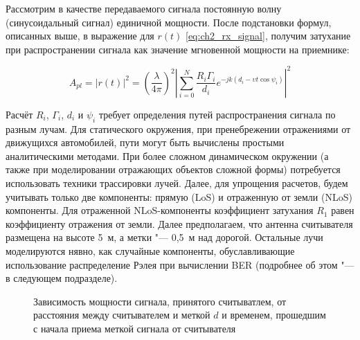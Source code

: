 Рассмотрим в качестве передаваемого сигнала постоянную волну (синусоидальный сигнал) единичной мощности. После подстановки формул, описанных выше, в выражение для $r(t)$ \eqref{eq:ch2_rx_signal}, получим затухание при распространении сигнала как значение мгновенной мощности на приемнике:

\begin{equation}
	A_{pl} = |r(t)|^2 = \left(\frac{\lambda}{4\pi}\right)^2
		\left|\sum\limits_{i=0}^{N} \frac{R_i\Gamma_i}{d_i}
		e^{-jk(d_i-\upsilon t \cos{\psi_i})}\right|^2
	\label{eq:ch2_pathloss}
\end{equation}

Расчёт $R_i$, $\Gamma_i$, $d_i$ и $\psi_i$ требует определения путей распространения сигнала по разным лучам. Для статического окружения, при пренебрежении отражениями от движущихся автомобилей, пути могут быть вычислены простыми аналитическими методами. При более сложном динамическом окружении (а также при моделировании отражающих объектов сложной формы) потребуется использовать техники трассировки лучей. Далее, для упрощения расчетов, будем учитывать только две компоненты: прямую (LoS) и отраженную от земли (NLoS) компоненты. Для отраженной NLoS-компоненты коэффициент затухания $R_1$ равен коэффициенту отражения от земли. Далее предполагаем, что антенна считывателя размещена на высоте 5~м, а метки "--- 0,5~м над дорогой. Остальные лучи моделируются нявно, как случайные компоненты,  обуславливающие использование распределение Рэлея при вычислении BER (подробнее об этом "--- в следующем подразделе).

\begin{figure}[h]
	\caption[Зависимость мощности сигналов, принятых меток и считывателем, от расстояния и времени]{Зависимость мощности сигнала, принятого считыватлем, от расстояния между считывателем и меткой $d$ и временем, прошедшим с начала приема меткой сигнала от считывателя}
	\label{fig:ch2_rx_power_doppler}
\end{figure}

